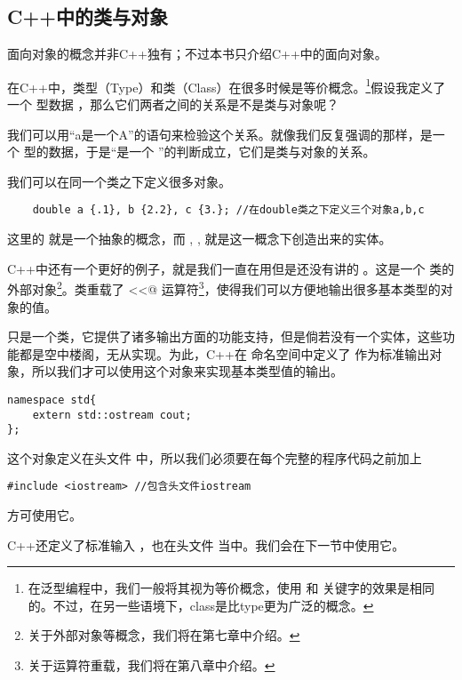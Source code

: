 \subsection*{C++中的类与对象}
面向对象的概念并非C++独有；不过本书只介绍C++中的面向对象。\par
在C++中，类型（Type）和类（Class）在很多时候是等价概念。\footnote{在泛型编程中，我们一般将其视为等价概念，使用 \lstinline@typename@ 和 \lstinline@class@ 关键字的效果是相同的。不过，在另一些语境下，class是比type更为广泛的概念。}假设我定义了一个 \lstinline@int@ 型数据 \lstinline@i@，那么它们两者之间的关系是不是类与对象呢？\par
我们可以用``a是一个A''的语句来检验这个关系。就像我们反复强调的那样，\lstinline@i@ 是一个 \lstinline@int@ 型的数据，于是``\lstinline@i@ 是一个 \lstinline@int@''的判断成立，它们是类与对象的关系。\par
我们可以在同一个类之下定义很多对象。
\begin{lstlisting}
    double a {.1}, b {2.2}, c {3.}; //在double类之下定义三个对象a,b,c
\end{lstlisting}
这里的 \lstinline@double@ 就是一个抽象的概念，而 \lstinline@a@, \lstinline@b@, \lstinline@c@ 就是这一概念下创造出来的实体。\par
C++中还有一个更好的例子，就是我们一直在用但是还没有讲的 \lstinline@cout@。这是一个 \lstinline@ostream@ 类的外部对象\footnote{关于外部对象等概念，我们将在第七章中介绍。}。\lstinline@ostream@ 类重载了 \lstinline@<<@ 运算符\footnote{关于运算符重载，我们将在第八章中介绍。}，使得我们可以方便地输出很多基本类型的对象的值。\par
\lstinline@ostream@ 只是一个类，它提供了诸多输出方面的功能支持，但是倘若没有一个实体，这些功能都是空中楼阁，无从实现。为此，C++在 \lstinline@std@ 命名空间中定义了 \lstinline@cout@ 作为标准输出对象，所以我们才可以使用这个对象来实现基本类型值的输出。
\begin{lstlisting}
namespace std{
    extern std::ostream cout;
};
\end{lstlisting}
这个对象定义在头文件 \lstinline@iostream@ 中，所以我们必须要在每个完整的程序代码之前加上
\begin{lstlisting}
#include <iostream> //包含头文件iostream
\end{lstlisting}
方可使用它。\par
C++还定义了标准输入 \lstinline@cin@，也在头文件 \lstinline@iostream@ 当中。我们会在下一节中使用它。\par
